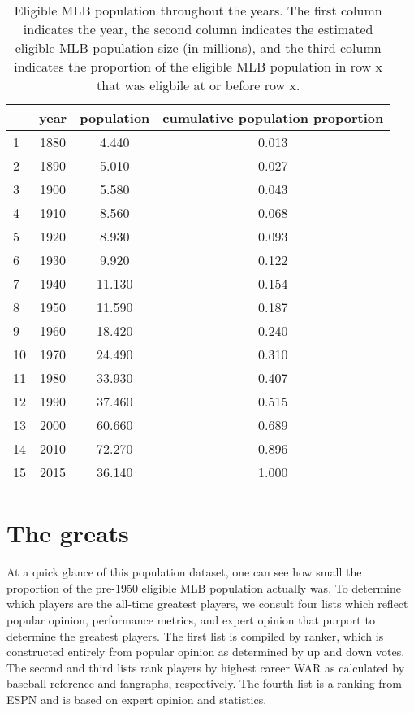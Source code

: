 \documentclass[11pt]{article}\usepackage[]{graphicx}\usepackage[]{color}
\begin{document}
\begin{table}[ht]
\centering
\begin{tabular}{lccc}
  \hline
 & year & population & cumulative population proportion \\ 
  \hline
1 & 1880 & 4.440 & 0.013 \\ 
  2 & 1890 & 5.010 & 0.027 \\ 
  3 & 1900 & 5.580 & 0.043 \\ 
  4 & 1910 & 8.560 & 0.068 \\ 
  5 & 1920 & 8.930 & 0.093 \\ 
  6 & 1930 & 9.920 & 0.122 \\ 
  7 & 1940 & 11.130 & 0.154 \\ 
  8 & 1950 & 11.590 & 0.187 \\ 
  9 & 1960 & 18.420 & 0.240 \\ 
  10 & 1970 & 24.490 & 0.310 \\ 
  11 & 1980 & 33.930 & 0.407 \\ 
  12 & 1990 & 37.460 & 0.515 \\ 
  13 & 2000 & 60.660 & 0.689 \\ 
  14 & 2010 & 72.270 & 0.896 \\ 
  15 & 2015 & 36.140 & 1.000 \\ 
   \hline
\end{tabular}
\caption{Eligible MLB population throughout the years. The first column 
    indicates the year, the second column indicates the estimated eligible MLB 
    population size (in millions), and the third column indicates the proportion 
    of the eligible MLB population in row x that was eligbile at or before row x.} 
\end{table}






\section{The greats}

At a quick glance of this population dataset, one can see how small the 
proportion of the pre-1950 eligible MLB population actually was. 
To determine which players are the all-time greatest players, we consult four 
lists which reflect popular opinion, performance metrics, and expert opinion 
that purport to determine the greatest players.  The first 
list is compiled by ranker, %
which is constructed entirely from popular opinion as determined by up and 
down votes.  
The second and third lists rank players by highest career WAR as calculated 
by baseball reference and fangraphs, respectively. 
The fourth list is a ranking from ESPN %
and is based on expert opinion and statistics. %
\end{document}
